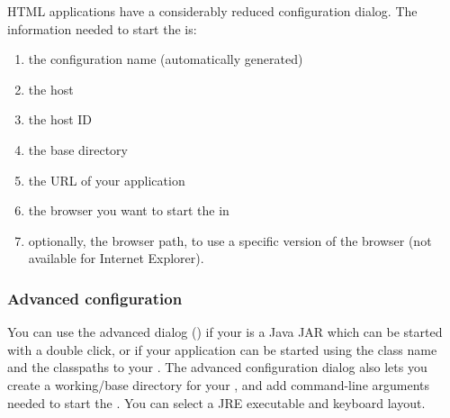 HTML applications have a considerably reduced configuration dialog. The information needed to start the \gdaut{} is:
\begin{enumerate}
\item the \gdaut{} configuration name (automatically generated)
\item the \gdagent{} host
\item the \gdagent{} host\gdaut{} ID
\item the base directory
\item the URL of your application
\item the browser you want to start the \gdaut{} in
\item optionally, the browser path, to use a specific version of the browser (not available for Internet Explorer). 
\end{enumerate}


\subsubsection{Advanced \gdaut{} configuration}
\label{AdvancedAUTConfig}

You can use the advanced dialog () if your \gdaut{} is a Java JAR which can be started with a double click, or if your application can be started using the class name and the classpaths to your \gdaut{}.  The advanced configuration dialog also lets you create a working/base directory for your \gdaut{}, and add command-line arguments needed to start the \gdaut{}. You can select a JRE executable and keyboard layout.

